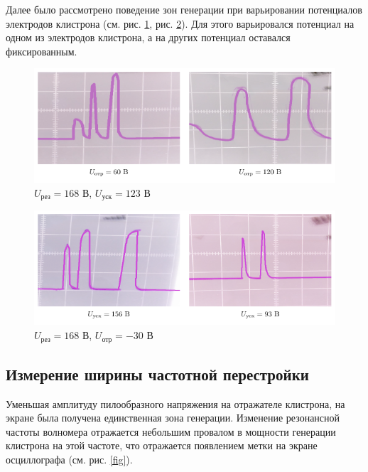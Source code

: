 \documentclass[a4paper,14pt]{extarticle}
\begin{document}
Далее было рассмотрено поведение зон генерации при варьировании потенциалов электродов клистрона (см. рис. \ref{ris:1}, рис. \ref{ris:2}). Для этого варьировался потенциал на одном из электродов клистрона, а на других потенциал оставался фиксированным.
\begin{figure}[H]
    \centering
    \includegraphics[width=\textwidth]{fig2/osci1.pdf}\vspace{-2em}
    \caption{   $U_\text{рез} = 168 \text{ В}$,
                $U_\text{уск} = 123 \text{ В}$            
            }
    \label{ris:1}
\end{figure}
\begin{figure}[H]
    \centering
    \includegraphics[width=\textwidth]{fig2/osci2.pdf}\vspace{-2em}
    \caption{   $U_\text{рез} = 168 \text{ В}$,
                $U_\text{отр} = -30 \text{ В}$
            }
    \label{ris:2}
\end{figure}





\newpage
\subsection{Измерение ширины частотной перестройки}
Уменьшая амплитуду пилообразного напряжения на отражателе клистрона, на экране была получена единственная зона генерации. Изменение резонансной частоты волномера отражается небольшим провалом в мощности генерации клистрона на этой частоте, что отражается появлением метки на экране осциллографа (см. рис. \ref{fig}).
\end{document}

